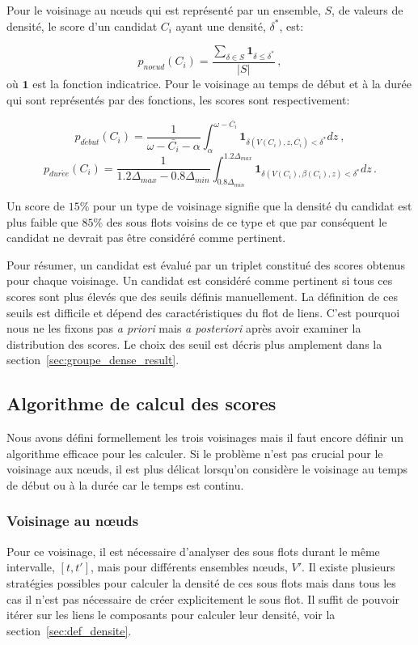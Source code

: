Pour le voisinage au n\oe uds qui est représenté par un ensemble, $S$, de valeurs de densité, le score d'un candidat $C_i$ ayant une densité, $\delta^*$, est:

\begin{equation}
p_{noeud}(C_i)= \dfrac{\sum_{\delta \in S} \mathbf{1}_{\delta \le \delta^*}}{|S|}\,,
\end{equation}
où $\mathbf{1}$ est la fonction indicatrice.
Pour le voisinage au temps de début et à la durée qui sont représentés par des fonctions, les scores sont respectivement:

\begin{equation}
p_{d\acute{e}but}(C_i)=\dfrac{1}{\omega-\bar{C_i} - \alpha} \int_{\alpha}^{\omega- \bar{C_i}} \mathbf{1}_{\delta(V(C_i),z,\bar{C_i}) <\delta^*} dz \ ,
\end{equation} 
\begin{equation}
p_{dur\acute{e}e}(C_i)=\dfrac{1}{1.2\Delta_{max} - 0.8\Delta_{min}} \int_{0.8\Delta_{min}}^{1.2\Delta_{max}} \mathbf{1}_{\delta(V(C_i),\beta(C_i),z) <\delta^*} dz \, .
\end{equation}

Un score de $15\%$ pour un type de voisinage signifie que la densité du candidat est plus faible que $85\%$ des sous flots voisins de ce type et que par conséquent le candidat ne devrait pas être considéré comme pertinent.

\bigskip
Pour résumer, un candidat est évalué par un triplet constitué des scores obtenus pour chaque voisinage.
Un candidat est considéré comme pertinent si tous ces scores sont plus élevés que des seuils définis manuellement.
La définition de ces seuils est difficile et dépend des caractéristiques du flot de liens.
C'est pourquoi nous ne les fixons pas \emph{a priori} mais \emph{a posteriori} après avoir examiner la distribution des scores.
Le choix des seuil est décris plus amplement dans la section~\ref{sec:groupe_dense_result}.

\subsection{Algorithme de calcul des scores}
Nous avons défini formellement les trois voisinages mais il faut encore définir un algorithme efficace pour les calculer.
Si le problème n'est pas crucial pour le voisinage aux n\oe uds, il est plus délicat lorsqu'on considère le voisinage au temps de début ou à la durée car le temps est continu.

\subsubsection{Voisinage au n\oe uds}
Pour ce voisinage, il est nécessaire d'analyser des sous flots durant le même intervalle, $[t,t']$, mais pour différents ensembles n\oe uds, $V'$.
Il existe plusieurs stratégies possibles pour calculer la densité  de ces sous flots mais dans tous les cas il n'est pas nécessaire de créer explicitement le sous flot.
Il suffit de pouvoir itérer sur les liens le composants pour calculer leur densité, voir la section~\ref{sec:def_densite}.

